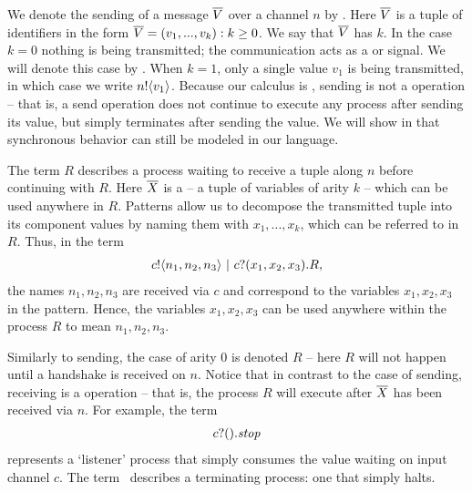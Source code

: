 	We denote the sending of a message $\overline{V}$ over a channel $n$ by .  
Here $\overline{V}$ is a tuple of identifiers in the form $\overline{V}=(v_1,...,v_k):k\geq 0$.  
We say that $\overline{V}$ has  $k$.  
In the case $k=0$ nothing is being transmitted; the communication acts as a  or signal.  
We will denote this case by .  
When $k=1$, only a single value $v_1$ is being transmitted, in which case we write ${n}!\langle{v_1}\rangle$.  
Because our calculus is , sending is not a  operation -- that is, a send operation does not continue to execute any process after sending its value, but simply terminates after sending the value.  
We will show in  that synchronous behavior can still be modeled in our language.
	
	The term $R$ describes a process waiting to receive a tuple along $n$ before continuing with $R$.  
Here $\overline{X}$ is a  -- a tuple of variables of arity $k$ -- which can be used anywhere in $R$.  
Patterns allow us to decompose the transmitted tuple into its component values by naming them with $x_1,...,x_k$, which can be referred to in $R$.  
Thus, in the term
	\begin{align}
		{c}!\langle{n_1,n_2,n_3}\rangle \ |\  {c}?({x_1,x_2,x_3}). R,
	\end{align}
the names $n_1,n_2,n_3$ are received via $c$ and correspond to the variables $x_1,x_2,x_3$ in the pattern.  
 Hence, the variables $x_1,x_2,x_3$ can be used anywhere within the process $R$ to mean $n_1,n_2,n_3$.  


Similarly to sending, the case of arity 0 is denoted $R$ -- here $R$ will not happen until a handshake is received on $n$.  
Notice that in contrast to the case of sending, receiving is a  operation -- that is, the process $R$ will execute after $\overline{X}$ has been received via $n$.  
For example, the term
\begin{align}
	{c}?({}).\mbox{\emph{stop}}
\end{align}
represents a `listener'	process that simply consumes the value waiting on input channel $c$.  
The term \pstop\ describes a terminating process: one that simply halts.

